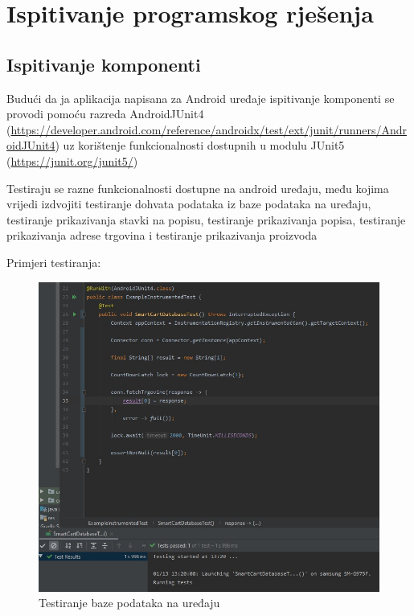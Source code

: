 		
		
		
		\eject
	\section{Ispitivanje programskog rješenja}
		\subsection{Ispitivanje komponenti}
			
			Budući da ja aplikacija napisana za Android uređaje ispitivanje komponenti
			se provodi pomoću razreda AndroidJUnit4 (\url{https://developer.android.com/reference/androidx/test/ext/junit/runners/AndroidJUnit4})
			uz korištenje funkcionalnosti dostupnih u modulu JUnit5 (\url{https://junit.org/junit5/})
			
			Testiraju se razne funkcionalnosti dostupne na android uređaju, među kojima
			vrijedi izdvojiti testiranje dohvata podataka iz baze podataka na uređaju, testiranje prikazivanja
			stavki na popisu, testiranje prikazivanja popisa, testiranje prikazivanja adrese trgovina i testiranje
			prikazivanja proizvoda
			
			Primjeri testiranja:
			
			\begin{figure}[H]
				\centering
				\includegraphics[scale=0.7]{slike/androidTest1.jpg}
				\caption{Testiranje baze podataka na uređaju}
				\label{fig:test_uredaj_db}
			\end{figure}
		
